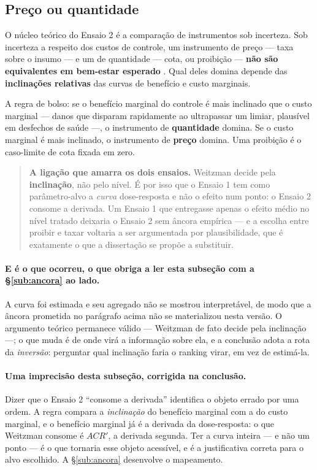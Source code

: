 \subsection{Preço ou quantidade}
\label{sub:weitzman}

O núcleo teórico do Ensaio 2 é a comparação de instrumentos sob incerteza. Sob
incerteza a respeito dos custos de controle, um instrumento de preço --- taxa
sobre o insumo --- e um de quantidade --- cota, ou proibição --- \textbf{não são
equivalentes em bem-estar esperado} \citep{weitzman1974}. Qual deles domina
depende das \textbf{inclinações relativas} das curvas de benefício e custo
marginais.

A regra de bolso: se o benefício marginal do controle é mais inclinado que o
custo marginal --- danos que disparam rapidamente ao ultrapassar um limiar,
plausível em desfechos de saúde ---, o instrumento de \textbf{quantidade} domina.
Se o custo marginal é mais inclinado, o instrumento de \textbf{preço} domina. Uma
proibição é o caso-limite de cota fixada em zero.

\begin{quote}
\textbf{A ligação que amarra os dois ensaios.} Weitzman decide pela
\textbf{inclinação}, não pelo nível. É por isso que o Ensaio 1 tem como
parâmetro-alvo a \emph{curva} dose-resposta e não o efeito num ponto: o Ensaio 2
consome a derivada. Um Ensaio 1 que entregasse apenas o efeito médio no nível
tratado deixaria o Ensaio 2 sem âncora empírica --- e a escolha entre proibir e
taxar voltaria a ser argumentada por plausibilidade, que é exatamente o que a
dissertação se propõe a substituir.
\end{quote}

\paragraph{E é o que ocorreu, o que obriga a ler esta subseção com a
§\ref{sub:ancora} ao lado.}
A curva foi estimada e seu agregado não se mostrou interpretável, de modo que a
âncora prometida no parágrafo acima não se materializou nesta versão. O
argumento teórico permanece válido --- Weitzman de fato decide pela inclinação
---; o que muda é de onde virá a informação sobre ela, e a conclusão adota a
rota da \emph{inversão}: perguntar qual inclinação faria o ranking virar, em vez
de estimá-la.

\paragraph{Uma imprecisão desta subseção, corrigida na conclusão.}
Dizer que o Ensaio 2 ``consome a derivada'' identifica o objeto errado por uma
ordem. A regra compara a \emph{inclinação} do benefício marginal com a do custo
marginal, e o benefício marginal já é a derivada da dose-resposta: o que
Weitzman consome é \(ACR'\), a derivada segunda. Ter a curva inteira --- e não
um ponto --- é o que tornaria esse objeto acessível, e é a justificativa correta
para o alvo escolhido. A §\ref{sub:ancora} desenvolve o mapeamento.

